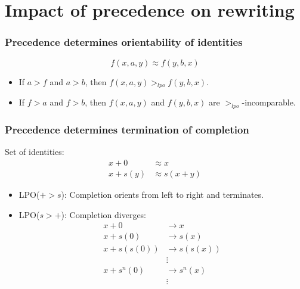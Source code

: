 \documentclass[a4paper]{beamer}
\begin{document}
\section{Impact of precedence on rewriting}

\begin{frame}
\frametitle{Precedence determines orientability of identities}
$$
f(x, a, y) \approx f(y, b, x)
$$

\begin{itemize}
\item If $a > f$ and $a > b$,
then $f(x, a, y) >_{lpo} f(y, b, x)$.
\item If $f > a$ and $f > b$,
then $f(x, a, y)$ and $f(y, b, x)$ are $>_{lpo}$-incomparable.
\end{itemize}
\end{frame}

\begin{frame}
\frametitle{Precedence determines termination of completion}
Set of identities:
\begin{align*}
x + 0 &\approx x \\
x + s(y) &\approx s(x + y)
\end{align*}

\begin{itemize}
\item LPO($+ > s$):
Completion orients from left to right and terminates.
\item LPO($s > +$):
Completion diverges:
\begin{align*}
x + 0 &\to x\\
x + s(0) &\to s(x)\\
x + s(s(0)) &\to s(s(x))\\
&\vdots\\
x + s^n(0) &\to s^n(x)\\
&\vdots
\end{align*}
\end{itemize}
\end{frame}
\end{document}
